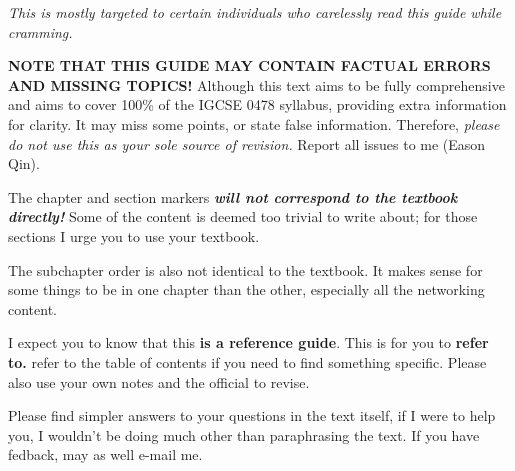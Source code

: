 \documentclass[../main.tex]{subfiles}
\begin{document}
\textit{This is mostly targeted to certain individuals who carelessly read this guide while cramming.}

\enumerate
    \item \textbf{NOTE THAT THIS GUIDE MAY CONTAIN FACTUAL ERRORS AND MISSING TOPICS!} Although this text aims to be fully comprehensive and aims to cover 100\% of the IGCSE 0478 syllabus, providing extra information for clarity. It may miss some points, or state false information. Therefore, \emph{please do not use this as your sole source of revision.} Report all issues to me (Eason Qin).
    \item The chapter and section markers \textbf{\textit{will not correspond to the textbook directly!}} Some of the content is deemed too trivial to write about; for those sections I urge you to use your textbook.
    \item The subchapter order is also not identical to the textbook. It makes sense for some things to be in one chapter than the other, especially all the networking content.
    \item I expect you to know that this \textbf{is a reference guide}. This is for you to \textbf{refer to.} refer to the table of contents if you need to find something specific. Please also use your own notes and the official to revise.
    \item Please find simpler answers to your questions in the text itself, if I were to help you, I wouldn't be doing much other than paraphrasing the text. If you have fedback, may as well e-mail me.
\endenumerate
\end{document}
